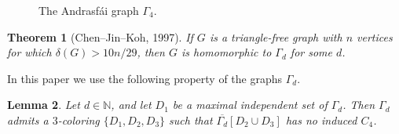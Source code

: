 \documentclass[a4paper,12pt]{article}
\newtheorem{theorem}{Theorem}
\newtheorem{lemma}[theorem]{Lemma}
\newtheorem{proposition}[theorem]{Proposition}
\begin{document}
\begin{figure}[ht]
    \centering
        \centering
    \caption{The Andrasfái graph $\Gamma_4$.}
    \label{fig:andrasfai_graph}
\end{figure}

\begin{theorem}[Chen--Jin--Koh, 1997]\label{thm:ChenJinKoh}
	If \(G\) is a triangle-free graph with \(n\) vertices
	for which \(\delta(G) > 10n/29\),
	then \(G\) is homomorphic to \(\Gamma_d\) for some \(d\).
\end{theorem}

In this paper we use the following property of the graphs \(\Gamma_d\).




\begin{lemma}\label{lemma:andrasfai_coloring}
	Let \(d\in\mathbb{N}\),
	and let \(D_1\) be a maximal independent set of \(\Gamma_d\).
	Then \(\Gamma_d\) admits a \(3\)-coloring \(\{D_1,D_2,D_3\}\)
	such that \(\overline{\Gamma_d}[D_2\cup D_3]\) has no induced \(C_4\).
\end{lemma}
\end{document}
